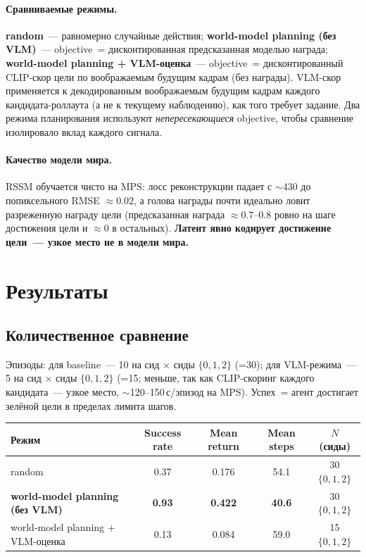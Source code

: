\documentclass[11pt]{article}
\begin{document}
\paragraph{Сравниваемые режимы.}
\textbf{random}~--- равномерно случайные действия;
\textbf{world-model planning (без VLM)}~--- objective~= дисконтированная предсказанная
моделью награда;
\textbf{world-model planning + VLM-оценка}~--- objective~= дисконтированный CLIP-скор
цели по воображаемым будущим кадрам (без награды). VLM-скор применяется к декодированным
воображаемым будущим кадрам каждого кандидата-роллаута (а не к текущему наблюдению), как
того требует задание. Два режима планирования используют \emph{непересекающиеся}
objective, чтобы сравнение изолировало вклад каждого сигнала.

\paragraph{Качество модели мира.}
RSSM обучается чисто на MPS: лосс реконструкции падает с $\sim$430 до попиксельного
RMSE $\approx 0.02$, а голова награды почти идеально ловит разреженную награду цели
(предсказанная награда $\approx 0.7$--$0.8$ ровно на шаге достижения цели и $\approx 0$
в остальных). \textbf{Латент явно кодирует достижение цели~--- узкое место не в модели
мира.}

\section{Результаты}
\label{sec:results}

\subsection{Количественное сравнение}
Эпизоды: для baseline~--- 10 на сид $\times$ сиды $\{0,1,2\}$ (=30); для VLM-режима~---
5 на сид $\times$ сиды $\{0,1,2\}$ (=15; меньше, так как CLIP-скоринг каждого кандидата~---
узкое место, $\sim$120--150\,с/эпизод на MPS). Успех~= агент достигает зелёной цели в
пределах лимита шагов.

\begin{center}
\small
\begin{tabular}{@{}>{\raggedright\arraybackslash}p{6.4cm}cccc@{}}
\toprule
Режим & Success rate & Mean return & Mean steps & $N$ (сиды) \\
\midrule
random & 0.37 & 0.176 & 54.1 & 30 $\{0,1,2\}$ \\
\textbf{world-model planning (без VLM)} & \textbf{0.93} & \textbf{0.422} & \textbf{40.6} & 30 $\{0,1,2\}$ \\
world-model planning + VLM-оценка & 0.13 & 0.084 & 59.0 & 15 $\{0,1,2\}$ \\
\bottomrule
\end{tabular}
\end{center}
\end{document}
